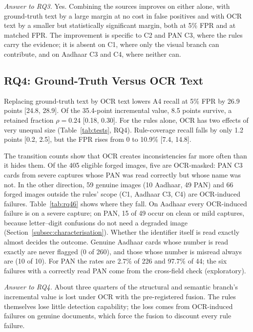\documentclass[12pt]{article}
\begin{document}
\emph{Answer to RQ3.} Yes. Combining the sources improves on either
alone, with ground-truth text by a large margin at no cost in false
positives and with OCR text by a smaller but statistically significant margin, both
at 5\% FPR and at matched FPR. The improvement is specific to C2 and
PAN C3, where the rules carry the evidence; it is absent on C1, where
only the visual branch can contribute, and on Aadhaar C3 and C4, where
neither can.

\subsection{RQ4: Ground-Truth Versus OCR Text}
\label{subsec:res-rq4}

Replacing ground-truth text by OCR text lowers A4 recall at 5\% FPR by
26.9 points [24.8, 28.9]. Of the 35.4-point incremental value, 8.5
points survive, a retained fraction $\rho=0.24$ [0.18, 0.30]. For the
rules alone, OCR has two effects of very unequal size
(Table~\ref{tab:tests}, RQ4). Rule-coverage recall falls by only 1.2
points [0.2, 2.5], but the FPR rises from 0 to 10.9\% [7.4, 14.8].

The transition counts show that OCR creates inconsistencies far more
often than it hides them. Of the 405 eligible forged images, five are
OCR-masked: PAN C3 cards from severe captures whose PAN was read
correctly but whose name was not. In the other direction, 59 genuine
images (10 Aadhaar, 49 PAN) and 66 forged images outside the rules'
scope (C1, Aadhaar C3, C4) are OCR-induced failures. Table~\ref{tab:rq46} shows
where they fall. On Aadhaar every OCR-induced failure is on a severe
capture; on PAN, 15 of 49 occur on clean or mild captures, because
letter--digit confusions do not need a degraded image
(Section~\ref{subsec:characterisation}). Whether the identifier itself
is read exactly almost decides the outcome. Genuine Aadhaar cards whose
number is read exactly are never flagged (0 of 260), and those whose
number is misread always are (10 of 10). For PAN the rates are 2.7\% of
226 and 97.7\% of 44; the six failures with a correctly read PAN come
from the cross-field check (exploratory).


\emph{Answer to RQ4.} About three quarters of the structural and
semantic branch's incremental value is lost under OCR with the
pre-registered fusion. The rules themselves lose little detection
capability; the loss comes from OCR-induced failures on genuine
documents, which force the fusion to discount every rule failure.
\end{document}
